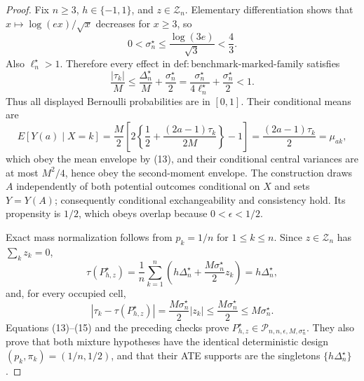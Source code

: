 \documentclass{article}
\begin{document}
\begin{proof}
Fix \(n\geq3\), \(h\in\{-1,1\}\), and \(z\in\mathcal Z_n\).  Elementary differentiation shows that \(x\mapsto\log(ex)/\sqrt{x}\) decreases for \(x\geq3\), so
\[
 0<\sigma_n^\star\leq\frac{\log(3e)}{\sqrt3}<\frac43.
\]
Also \(\ell_n^\star>1\).  Therefore every effect in \(\mathrm{def:benchmark\text{-}marked\text{-}family}\) satisfies
\[
 \frac{|\tau_k|}{M}
 \leq\frac{\Delta_n^\star}{M}+\frac{\sigma_n^\star}{2}
 =\frac{\sigma_n^\star}{4\ell_n^\star}+\frac{\sigma_n^\star}{2}
 <1. \tag{13}
\]
Thus all displayed Bernoulli probabilities are in \([0,1]\).  Their conditional means are
\[
 E[Y(a)\mid X=k]
 =\frac M2\left[2\left\{\frac12+\frac{(2a-1)\tau_k}{2M}\right\}-1\right]
 =\frac{(2a-1)\tau_k}{2}=\mu_{ak},
\]
which obey the mean envelope by (13), and their conditional central variances are at most \(M^2/4\), hence obey the second-moment envelope.  The construction draws \(A\) independently of both potential outcomes conditional on \(X\) and sets \(Y=Y(A)\); consequently conditional exchangeability and consistency hold.  Its propensity is \(1/2\), which obeys overlap because \(0<\epsilon<1/2\).

Exact mass normalization follows from \(p_k=1/n\) for \(1\leq k\leq n\).  Since \(z\in\mathcal Z_n\) has \(\sum_kz_k=0\),
\[
 \tau(P_{h,z}^\star)
 =\frac1n\sum_{k=1}^n\left(h\Delta_n^\star+\frac{M\sigma_n^\star}{2}z_k\right)
 =h\Delta_n^\star, \tag{14}
\]
and, for every occupied cell,
\[
 |\tau_k-\tau(P_{h,z}^\star)|
 =\frac{M\sigma_n^\star}{2}|z_k|
 \leq\frac{M\sigma_n^\star}{2}
 \leq M\sigma_n^\star. \tag{15}
\]
Equations (13)--(15) and the preceding checks prove \(P_{h,z}^\star\in\mathcal P_{n,n,\epsilon,M,\sigma_n^\star}\).  They also prove that both mixture hypotheses have the identical deterministic design \((p_k,\pi_k)=(1/n,1/2)\), and that their ATE supports are the singletons \(\{h\Delta_n^\star\}\).


\end{proof}
\end{document}
